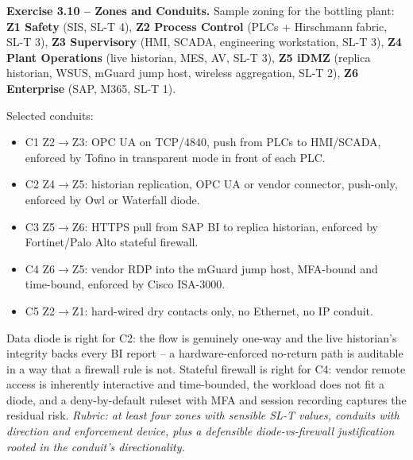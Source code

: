 \documentclass[11pt,a4paper]{article}
\begin{document}
\begin{solutionbox}
\textbf{Exercise 3.10 -- Zones and Conduits.}
Sample zoning for the bottling plant: \textbf{Z1 Safety} (SIS, SL-T 4), \textbf{Z2 Process Control} (PLCs + Hirschmann fabric, SL-T 3), \textbf{Z3 Supervisory} (HMI, SCADA, engineering workstation, SL-T 3), \textbf{Z4 Plant Operations} (live historian, MES, AV, SL-T 3), \textbf{Z5 iDMZ} (replica historian, WSUS, mGuard jump host, wireless aggregation, SL-T 2), \textbf{Z6 Enterprise} (SAP, M365, SL-T 1).

Selected conduits:
\begin{itemize}\setlength{\itemsep}{1pt}
  \item C1 Z2$\to$Z3: OPC UA on TCP/4840, push from PLCs to HMI/SCADA, enforced by Tofino in transparent mode in front of each PLC.
  \item C2 Z4$\to$Z5: historian replication, OPC UA or vendor connector, push-only, enforced by Owl or Waterfall diode.
  \item C3 Z5$\to$Z6: HTTPS pull from SAP BI to replica historian, enforced by Fortinet/Palo Alto stateful firewall.
  \item C4 Z6$\to$Z5: vendor RDP into the mGuard jump host, MFA-bound and time-bound, enforced by Cisco ISA-3000.
  \item C5 Z2$\to$Z1: hard-wired dry contacts only, no Ethernet, no IP conduit.
\end{itemize}
Data diode is right for C2: the flow is genuinely one-way and the live historian's integrity backs every BI report -- a hardware-enforced no-return path is auditable in a way that a firewall rule is not. Stateful firewall is right for C4: vendor remote access is inherently interactive and time-bounded, the workload does not fit a diode, and a deny-by-default ruleset with MFA and session recording captures the residual risk. \emph{Rubric: at least four zones with sensible SL-T values, conduits with direction and enforcement device, plus a defensible diode-vs-firewall justification rooted in the conduit's directionality.}
\end{solutionbox}
\end{document}
